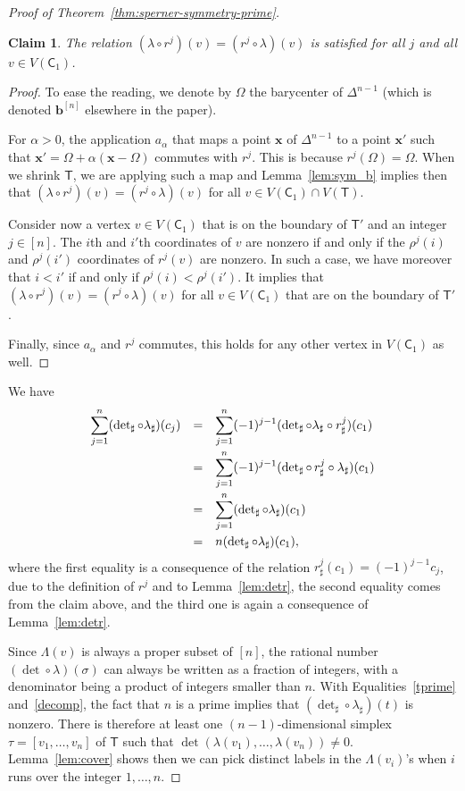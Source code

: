 \documentclass[12pt]{amsart}
\newtheorem*{claim}{Claim}
\theoremstyle{definition}
\theoremstyle{remark}
\def\T{\mathsf{T}}
\def\C{\mathsf{C}}
\def\bb{\boldsymbol{b}}
\def\xx{\boldsymbol{x}}
\def\ds{\displaystyle}
\def\det{\operatorname{det}}
\begin{document}
\begin{proof}[Proof of Theorem~\ref{thm:sperner-symmetry-prime}]
\begin{claim}
The relation $(\lambda\circ r^j)(v)=(r^j\circ\lambda)(v)$ is satisfied for all $j$ and all $v\in V(\C_1)$.
\end{claim}
\begin{proof}
To ease the reading, we denote by $\Omega$ the barycenter of $\Delta^{n-1}$ (which is denoted $\bb^{[n]}$ elsewhere in the paper).

For $\alpha>0$, the application $a_{\alpha}$ that maps a point $\xx$ of $\Delta^{n-1}$ to a point $\xx'$ such that $\xx'=\Omega+\alpha(\xx-\Omega)$ commutes with $r^j$. This is because $r^j(\Omega)=\Omega$. When we shrink $\T$, we are applying such a map and Lemma~\ref{lem:sym_b} implies then that $(\lambda\circ r^j)(v)=(r^j\circ\lambda)(v)$ for all $v\in V(\C_1)\cap V(\T)$.

Consider now a vertex $v\in V(\C_1)$ that is on the boundary of $\T'$ and an integer $j\in[n]$. The $i$th and $i'$th coordinates of $v$ are nonzero if and only if the $\rho^j(i)$ and $\rho^j(i')$ coordinates of $r^j(v)$ are nonzero. In such a case, we have moreover that $i<i'$ if and only if $\rho^j(i)<\rho^j(i')$. It implies that $(\lambda\circ r^j)(v)=(r^j\circ\lambda)(v)$ for all $v\in V(\C_1)$ that are on the boundary of $\T'$.

Finally, since $a_{\alpha}$ and $r^j$ commutes, this holds for any other vertex in $V(\C_1)$ as well.
\end{proof}


We have 
$$\begin{array}{rcl}
\ds{\sum_{j=1}^n(\det_{\sharp}\circ\lambda_{\sharp})(c_j)} & = & \ds{\sum_{j=1}^n(-1)^{j-1}(\det_{\sharp}\circ\lambda_{\sharp}\circ r^j_{\sharp})(c_1)}\smallskip \\ 
& = & \ds{\sum_{j=1}^n(-1)^{j-1}(\det_{\sharp}\circ\, r^j_{\sharp}\circ\lambda_{\sharp})(c_1)}\smallskip \\ 
& = & \ds{\sum_{j=1}^n(\det_{\sharp}\circ\lambda_{\sharp})(c_1)}\smallskip\\ 
& = & n(\det_{\sharp}\circ\lambda_{\sharp})(c_1),
\end{array}$$
where the first equality is a consequence of the relation $r^j_{\sharp}(c_1)=(-1)^{j-1}c_j$, due to the definition of $r^j$ and to Lemma~\ref{lem:detr}, the second equality comes from the claim above, and the third one is again a consequence of Lemma~\ref{lem:detr}.

Since $\Lambda(v)$ is always a proper subset of $[n]$, the rational number $(\det\circ\lambda)(\sigma)$ can always be written as a fraction of integers, with a denominator being a product of integers smaller than $n$. With Equalities~\eqref{tprime} and~\eqref{decomp}, the fact that $n$ is a prime implies that $(\det_{\sharp}\circ\lambda_{\sharp})(t)$ is nonzero. There is therefore at least one $(n-1)$-dimensional simplex $\tau=[v_1,\ldots,v_n]$ of $\T$ such that $\det(\lambda(v_1),\ldots,\lambda(v_n))\neq 0$. Lemma~\ref{lem:cover} shows then we can pick distinct labels in the $\Lambda(v_i)$'s when $i$ runs over the integer $1,\ldots,n$.
\end{proof}
\end{document}
